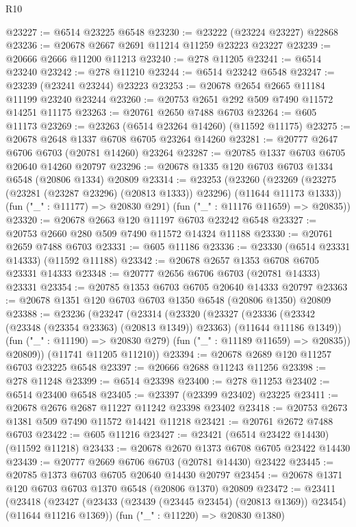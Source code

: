 \begin{lexlean}{R10}
\begin{coremodule}
{{{{{{{{{{{{{{{{{{{{{{{{{{{{{{{{{{{{{{{{{{{{{{{{{{{{{{{{{{{{{{{{{{{{{{{{{{{{{{{{{{{{@23227 := @6514 @23225 @6548
@23230 := @23222 (@23224 @23227) @22868
@23236 := @20678 @2667 @2691 @11214 @11259 @23223 @23227
@23239 := @20666 @2666 @11200 @11213
@23240 := @278 @11205
@23241 := @6514 @23240
@23242 := @278 @11210
@23244 := @6514 @23242 @6548
@23247 := @23239 (@23241 @23244) @23223
@23253 := @20678 @2654 @2665 @11184 @11199 @23240 @23244
@23260 := @20753 @2651 @292 @509 @7490 @11572 @14251 @11175
@23263 := @20761 @2650 @7488 @6703
@23264 := @605 @11173
@23269 := @23263 (@6514 @23264 @14260) (@11592 @11175)
@23275 := @20678 @2648 @1337 @6708 @6705 @23264 @14260
@23281 := @20777 @2647 @6706 @6703 (@20781 @14260) @23264
@23287 := @20785 @1337 @6703 @6705 @20640 @14260 @20797
@23296 := @20678 @1335 @120 @6703 @6703 @1334 @6548 (@20806 @1334) @20809
@23314 := @23253
    (@23260
      (@23269 (@23275 (@23281 (@23287 @23296) (@20813 @1333)) @23296) (@11644 @11173 @1333))
      (fun ("_" : @11177) => @20830 @291)
      (fun ("_" : @11176 @11659) => @20835))
@23320 := @20678 @2663 @120 @11197 @6703 @23242 @6548
@23327 := @20753 @2660 @280 @509 @7490 @11572 @14324 @11188
@23330 := @20761 @2659 @7488 @6703
@23331 := @605 @11186
@23336 := @23330 (@6514 @23331 @14333) (@11592 @11188)
@23342 := @20678 @2657 @1353 @6708 @6705 @23331 @14333
@23348 := @20777 @2656 @6706 @6703 (@20781 @14333) @23331
@23354 := @20785 @1353 @6703 @6705 @20640 @14333 @20797
@23363 := @20678 @1351 @120 @6703 @6703 @1350 @6548 (@20806 @1350) @20809
@23388 := @23236
    (@23247
      (@23314
        (@23320
          (@23327
            (@23336 (@23342 (@23348 (@23354 @23363) (@20813 @1349)) @23363) (@11644 @11186 @1349))
            (fun ("_" : @11190) => @20830 @279)
            (fun ("_" : @11189 @11659) => @20835))
          @20809))
      (@11741 @11205 @11210))
@23394 := @20678 @2689 @120 @11257 @6703 @23225 @6548
@23397 := @20666 @2688 @11243 @11256
@23398 := @278 @11248
@23399 := @6514 @23398
@23400 := @278 @11253
@23402 := @6514 @23400 @6548
@23405 := @23397 (@23399 @23402) @23225
@23411 := @20678 @2676 @2687 @11227 @11242 @23398 @23402
@23418 := @20753 @2673 @1381 @509 @7490 @11572 @14421 @11218
@23421 := @20761 @2672 @7488 @6703
@23422 := @605 @11216
@23427 := @23421 (@6514 @23422 @14430) (@11592 @11218)
@23433 := @20678 @2670 @1373 @6708 @6705 @23422 @14430
@23439 := @20777 @2669 @6706 @6703 (@20781 @14430) @23422
@23445 := @20785 @1373 @6703 @6705 @20640 @14430 @20797
@23454 := @20678 @1371 @120 @6703 @6703 @1370 @6548 (@20806 @1370) @20809
@23472 := @23411
    (@23418
      (@23427 (@23433 (@23439 (@23445 @23454) (@20813 @1369)) @23454) (@11644 @11216 @1369))
      (fun ("_" : @11220) => @20830 @1380)
}}}}}}}}}}}}}}}}}}}}}}}}}}}}}}}}}}}}}}}}}}}}}}}}}}}}}}}}}}}}}}}}}}}}}}}}}}}}}}}}}}}}
\end{coremodule}
\end{lexlean}
